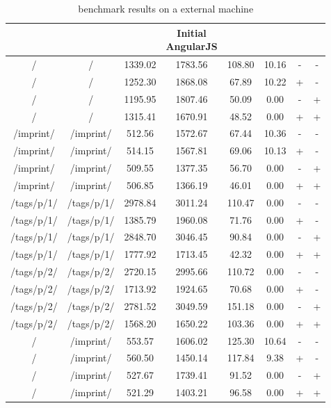 \begin{appendix}
\begin{center}
\footnotesize
\begin{longtable}{cccccccc}
    \caption{\selenium{} benchmark results on a external machine}
    \\
	\hline
	\thead{From} & \thead{To} & \thead{Common} & \thead{Initial\\AngularJS} & \thead{\lare{}} & \thead{AngularJS} &  \thead{DC} & \thead{TC} \\
\hline
/ & / & 1339.02 & 1783.56 & 108.80 & 10.16 & - & - \\
/ & / & 1252.30 & 1868.08 & 67.89 & 10.22 & + & - \\
/ & / & 1195.95 & 1807.46 & 50.09 & 0.00 & - & + \\
/ & / & 1315.41 & 1670.91 & 48.52 & 0.00 & + & + \\
\hline
/imprint/ & /imprint/ & 512.56 & 1572.67 & 67.44 & 10.36 & - & - \\
/imprint/ & /imprint/ & 514.15 & 1567.81 & 69.06 & 10.13 & + & - \\
/imprint/ & /imprint/ & 509.55 & 1377.35 & 56.70 & 0.00 & - & + \\
/imprint/ & /imprint/ & 506.85 & 1366.19 & 46.01 & 0.00 & + & + \\
\hline
/tags/p/1/ & /tags/p/1/ & 2978.84 & 3011.24 & 110.47 & 0.00 & - & - \\
/tags/p/1/ & /tags/p/1/ & 1385.79 & 1960.08 & 71.76 & 0.00 & + & - \\
/tags/p/1/ & /tags/p/1/ & 2848.70 & 3046.45 & 90.84 & 0.00 & - & + \\
/tags/p/1/ & /tags/p/1/ & 1777.92 & 1713.45 & 42.32 & 0.00 & + & + \\
\hline
/tags/p/2/ & /tags/p/2/ & 2720.15 & 2995.66 & 110.72 & 0.00 & - & - \\
/tags/p/2/ & /tags/p/2/ & 1713.92 & 1924.65 & 70.68 & 0.00 & + & - \\
/tags/p/2/ & /tags/p/2/ & 2781.52 & 3049.59 & 151.18 & 0.00 & - & + \\
/tags/p/2/ & /tags/p/2/ & 1568.20 & 1650.22 & 103.36 & 0.00 & + & + \\
\hline
\hline
/ & /imprint/ & 553.57 & 1606.02 & 125.30 & 10.64 & - & - \\
/ & /imprint/ & 560.50 & 1450.14 & 117.84 & 9.38 & + & - \\
/ & /imprint/ & 527.67 & 1739.41 & 91.52 & 0.00 & - & + \\
/ & /imprint/ & 521.29 & 1403.21 & 96.58 & 0.00 & + & + \\

\end{longtable}
\end{center}
\end{appendix}
